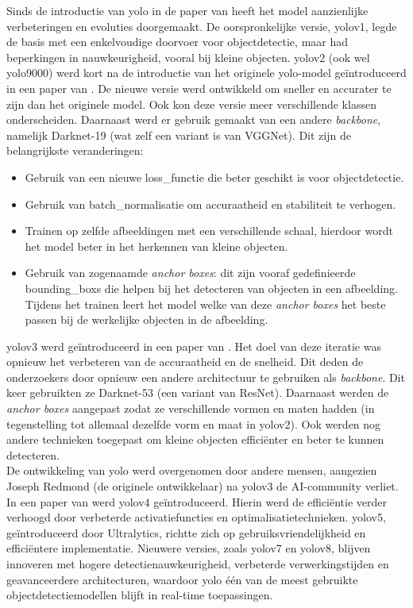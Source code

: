 Sinds de introductie van \gls{yolo} in de paper van \textcite{Redmon_2016} heeft het model aanzienlijke verbeteringen en evoluties doorgemaakt. De oorspronkelijke versie, \gls{yolo}v1, legde de basis met een enkelvoudige doorvoer voor objectdetectie, maar had beperkingen in nauwkeurigheid, vooral bij kleine objecten. \gls{yolo}v2 (ook wel \gls{yolo}9000) werd kort na de introductie van het originele \gls{yolo}-model geïntroduceerd in een paper van \textcite{Redmon_2016_YOLOv2}. De nieuwe versie werd ontwikkeld om sneller en accurater te zijn dan het originele model. Ook kon deze versie meer verschillende klassen onderscheiden. Daarnaast werd er gebruik gemaakt van een andere \emph{backbone}, namelijk Darknet-19 (wat zelf een variant is van VGGNet). Dit zijn de belangrijkste veranderingen:

\begin{itemize}
    \item Gebruik van een nieuwe \gls{loss_functie} die beter geschikt is voor objectdetectie.
    \item Gebruik van \gls{batch_normalisatie} om accuraatheid en stabiliteit te verhogen.
    \item Trainen op zelfde afbeeldingen met een verschillende schaal, hierdoor wordt het model beter in het herkennen van kleine objecten.
    \item Gebruik van zogenaamde \emph{anchor boxes}: dit zijn vooraf gedefinieerde \glspl{bounding_box} die helpen bij het detecteren van objecten in een afbeelding. Tijdens het trainen leert het model welke van deze \emph{anchor boxes} het beste passen bij de werkelijke objecten in de afbeelding.
\end{itemize}

\gls{yolo}v3 werd geïntroduceerd in een paper van \textcite{Redmon_2018}. Het doel van deze iteratie was opnieuw het verbeteren van de accuraatheid en de snelheid. Dit deden de onderzoekers door opnieuw een andere architectuur te gebruiken als \emph{backbone}. Dit keer gebruikten ze Darknet-53 (een variant van ResNet). Daarnaast werden de \emph{anchor boxes} aangepast zodat ze verschillende vormen en maten hadden (in tegenstelling tot allemaal dezelfde vorm en maat in \gls{yolo}v2). Ook werden nog andere technieken toegepast om kleine objecten efficiënter en beter te kunnen detecteren. \\

De ontwikkeling van \gls{yolo} werd overgenomen door andere mensen, aangezien Joseph Redmond (de originele ontwikkelaar) na \gls{yolo}v3 de AI-community verliet. In een paper van \textcite{Bochkovskiy_2020} werd \gls{yolo}v4 geïntroduceerd. Hierin werd de efficiëntie verder verhoogd door verbeterde activatiefuncties en optimalisatietechnieken. \gls{yolo}v5, geïntroduceerd door Ultralytics, richtte zich op gebruiksvriendelijkheid en efficiëntere implementatie. \autocite{Jiang_2022} Nieuwere versies, zoals \gls{yolo}v7 en \gls{yolo}v8, blijven innoveren met hogere detectienauwkeurigheid, verbeterde verwerkingstijden en geavanceerdere architecturen, waardoor \gls{yolo} één van de meest gebruikte objectdetectiemodellen blijft in real-time toepassingen. \autocite{Terven_2023} \\

